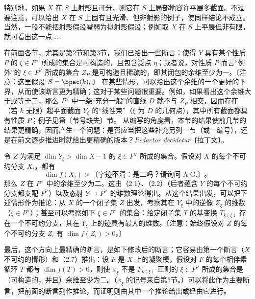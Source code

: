 特别地，如果 $X$ 在 $S$ 上射影且可分，则它在 $S$ 上局部地容许平展多截面。不过要注意，可以给出 $X$ 在 $S$ 上固有且光滑、但非射影的例子，使同样结论不成立。当然，一般不能把射影假设减弱为拟射影假设；例如取 $X$ 在 $S$ 上平展但非有限，就可看出这一点……



在前面各节，尤其是第2节和第3节，我们已给出一些断言：使得 $Y$ 具有某个性质 $P$ 的 $\xi\in P^\vee$ 所成的集合是可构造的，且包含泛点 $\eta$；或者说，对性质 $P$ 而言“例外”的 $\xi\in P^\vee$ 所成的集合 $Z_P$ 是可构造且稀疏的，即其闭包的余维至少为一。〔注意：这里假设 $S=\Spec(k)$。〕
在某些情形，可以给出这个余维的一个更好的下界，从而使该断言更为精确；这对于某些问题很重要。例如，如果看出这个余维大于或等于二，那么 $P^\vee$ 中一条“充分一般”的直线 $D$ 就不与 $Z_P$ 相交，因而存在（若 $k$ 无限）超平面截面 $Y_\xi$ 的“线性束”（$\xi$ 为 $D$ 的几何点），其中所有截面都具有性质 $P$；例子见第〔节号缺失〕节。
从编写的角度看，本节的结果使前几节的结果更精确，因而产生一个问题：是否应当把这些补充另列一节（或一编号），还是在前文逐步推进时就给出更精确的版本？\textit{Redactor decidetur}〔拉丁文〕。

令 $Z$ 为满足 $\dim Y_\xi>\dim X-1$ 的 $\xi\in P^\vee$ 所成的集合。假设对 $X$ 的每个不可约分支 $X_i$，都有
\[
\dim f(X_i)>\text{〔字迹不清：是二吗？请询问 A.G.〕}\text{。}
\]
那么 $Z$ 在 $P^\vee$ 中的余维至少为二。这由（2.1）、（2.2）（后者蕴含 $Y$ 的每个不可约分支都支配 $P^\vee$）以及态射 $Y\to P^\vee$ 的维数理论得出。从这个结果出发，可以把下述情形作为推论：从 $X$ 的一个闭子集 $Z$ 出发，考察其在 $Y_\xi$ 中的逆像 $Z_\xi$ 的维数（$\xi\in P^\vee$）；甚至可以考察如下 $\xi\in P^\vee$ 的集合：给定闭子集 $T$ 的基变换 $T_{k(\xi)}$ 存在一个不可约分支，其在 $Y_\xi$ 上的迹具有最大的维数。〔注意：始终假设对 $Z$ 的每个不可约分支 $Z_i$ 有 $\dim f(Z_i)>0$。〕

最后，这个方向上最精确的断言，是如下修改后的断言；它容易由第一个断言（$X$ 不可约的情形）和（2.7）推出：设 $F$ 是 $X$ 上的凝聚模，假设对 $F$ 的每个相伴素循环 $T$ 都有 $\dim f(T)>0$，则使 $\phi_\xi$ 不是 $F_{k(\xi)}$-正则的 $\xi\in P^\vee$ 所成的集合是（可构造的，并且）余维至少为二。（$\phi_\xi$ 的记号来自第5节。）可以将此作为主要断言，把前面的断言列作推论，而证明则由其中一个推论给出或经由它进行。

